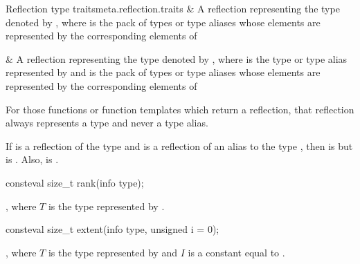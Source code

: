 \begin{libreqtab2b}{Reflection type traits}{meta.reflection.traits}
  &
A reflection representing the type denoted by
,
where  is the pack of types or type aliases
whose elements are represented by the corresponding elements of 
\\  \rowsep

  &
A reflection representing the type denoted by
,
where  is the type or type alias represented by 
and  is the pack of types or type aliases
whose elements are represented by the corresponding elements of 
\\
\end{libreqtab2b}

\pnum
\begin{note}
For those functions or function templates which return a reflection,
that reflection always represents a type and never a type alias.
\end{note}

\pnum
\begin{note}
If  is a reflection of the type 
and  is a reflection of an alias to the type ,
then  is 
but  is .
Also,  is .
\end{note}

%
\begin{itemdecl}
consteval size_t rank(info type);
\end{itemdecl}

\begin{itemdescr}
\pnum
\returns
{},
where $T$ is the type represented by .
\end{itemdescr}

%
\begin{itemdecl}
consteval size_t extent(info type, unsigned i = 0);
\end{itemdecl}

\begin{itemdescr}
\pnum
\returns
{},
where $T$ is the type represented by 
and $I$ is a constant equal to .
\end{itemdescr}

